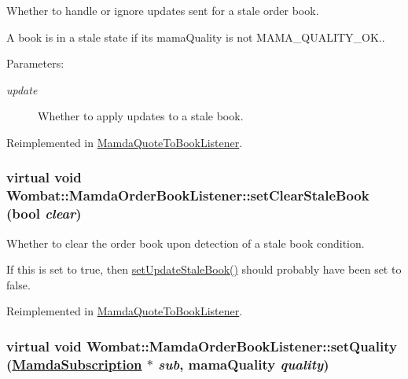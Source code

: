 Whether to handle or ignore updates sent for a stale order book. 

A book is in a stale state if its mama\-Quality is not MAMA\_\-QUALITY\_\-OK..

\begin{Desc}
\item[Parameters:]
\begin{description}
\item[{\em update}]Whether to apply updates to a stale book. \end{description}
\end{Desc}


Reimplemented in \hyperlink{classMamdaQuoteToBookListener_008e8954749115fa7cedc257e61480c3}{Mamda\-Quote\-To\-Book\-Listener}.\hypertarget{classWombat_1_1MamdaOrderBookListener_6dd743bb5c20544a503004f6053a1fda}{
\subsubsection[setClearStaleBook]{\setlength{\rightskip}{0pt plus 5cm}virtual void Wombat::Mamda\-Order\-Book\-Listener::set\-Clear\-Stale\-Book (bool {\em clear})}}
\label{classWombat_1_1MamdaOrderBookListener_6dd743bb5c20544a503004f6053a1fda}


Whether to clear the order book upon detection of a stale book condition. 

If this is set to true, then \hyperlink{classWombat_1_1MamdaOrderBookListener_a32964aa10c3d4f2021f55018585d4a7}{set\-Update\-Stale\-Book()} should probably have been set to false. 

Reimplemented in \hyperlink{classMamdaQuoteToBookListener_f82df90339d23957d41fc15831b6753f}{Mamda\-Quote\-To\-Book\-Listener}.\hypertarget{classWombat_1_1MamdaOrderBookListener_224baaa3e2a4d9d5fe5b062cf9fe1082}{
\subsubsection[setQuality]{\setlength{\rightskip}{0pt plus 5cm}virtual void Wombat::Mamda\-Order\-Book\-Listener::set\-Quality (\hyperlink{classWombat_1_1MamdaSubscription}{Mamda\-Subscription} $\ast$ {\em sub}, mama\-Quality {\em quality})}}
\label{classWombat_1_1MamdaOrderBookListener_224baaa3e2a4d9d5fe5b062cf9fe1082}


